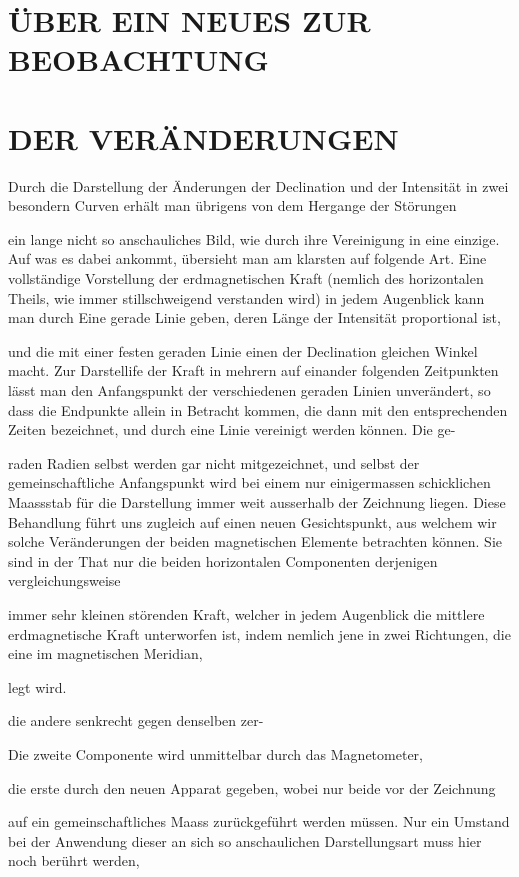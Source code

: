 \documentclass[12pt,a4paper]{article}
\begin{document}
\section*{ÜBER EIN NEUES ZUR BEOBACHTUNG}
\section*{DER VERÄNDERUNGEN}
Durch die Darstellung der Änderungen der Declination und der Intensität in zwei besondern Curven erhält man übrigens von dem Hergange der Störungen

ein lange nicht so anschauliches Bild, wie durch ihre Vereinigung in eine einzige. Auf was es dabei ankommt, übersieht man am klarsten auf folgende Art. Eine vollständige Vorstellung der erdmagnetischen Kraft (nemlich des horizontalen Theils, wie immer stillschweigend verstanden wird) in jedem Augenblick kann man durch Eine gerade Linie geben, deren Länge der Intensität proportional ist,

und die mit einer festen geraden Linie einen der Declination gleichen Winkel macht. Zur Darstellife der Kraft in mehrern auf einander folgenden Zeitpunkten lässt man den Anfangspunkt der verschiedenen geraden Linien unverändert, so dass die Endpunkte allein in Betracht kommen, die dann mit den entsprechenden Zeiten bezeichnet, und durch eine Linie vereinigt werden können. Die ge-

raden Radien selbst werden gar nicht mitgezeichnet, und selbst der gemeinschaftliche Anfangspunkt wird bei einem nur einigermassen schicklichen Maassstab für die Darstellung immer weit ausserhalb der Zeichnung liegen. Diese Behandlung führt uns zugleich auf einen neuen Gesichtspunkt, aus welchem wir solche Veränderungen der beiden magnetischen Elemente betrachten können. Sie sind in der That nur die beiden horizontalen Componenten derjenigen vergleichungsweise

immer sehr kleinen störenden Kraft, welcher in jedem Augenblick die mittlere erdmagnetische Kraft unterworfen ist, indem nemlich jene in zwei Richtungen, die eine im magnetischen Meridian,

legt wird.

die andere senkrecht gegen denselben zer-

Die zweite Componente wird unmittelbar durch das Magnetometer,

die erste durch den neuen Apparat gegeben, wobei nur beide vor der Zeichnung

auf ein gemeinschaftliches Maass zurückgeführt werden müssen. Nur ein Umstand bei der Anwendung dieser an sich so anschaulichen Darstellungsart muss hier noch berührt werden,
\end{document}
